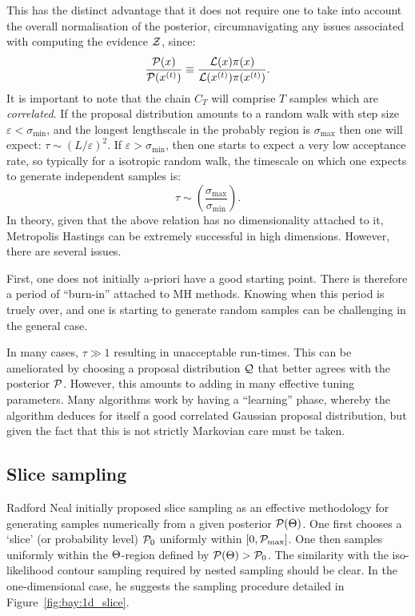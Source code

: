This has the distinct advantage that it does not require one to take into account the overall normalisation of the posterior, circumnavigating any issues associated with computing the evidence $\mathcal{Z}$, since:
\begin{equation}
  \frac{\mathcal{P}(x)}{\mathcal{P}(x^{(t)})} \equiv
  \frac{\mathcal{L}(x)\pi(x)}{\mathcal{L}(x^{(t)})\pi(x^{(t)})}.
\end{equation}
It is important to note that the chain $C_T$ will comprise $T$ samples which are {\em correlated}. If the proposal distribution amounts to a random walk with step size $\varepsilon<\sigma_{\min{}}$, and the longest lengthscale in the probably region is $\sigma_{\max{}}$  then one will expect: $\tau \sim {(L/\varepsilon)}^2$. If $\varepsilon>\sigma_{\min{}}$, then one starts to expect a very low acceptance rate, so typically for a isotropic random walk, the timescale on which one expects to generate independent samples is:
\begin{equation}
  \tau \sim \left( \frac{\sigma_{\max{}}}{\sigma_{\min{}}} \right).
\end{equation}
In theory, given that the above relation has no dimensionality attached to it, Metropolis Hastings can be extremely successful in high dimensions. However, there are several issues.

First, one does not initially a-priori have a good starting point. There is therefore a period of ``burn-in'' attached to MH methods. Knowing when this period is truely over, and one is starting to generate random samples can be challenging in the general case.

In many cases, $\tau\gg1$ resulting in unacceptable run-times. This can be ameliorated by choosing a proposal distribution $\mathcal{Q}$ that better agrees with the posterior $\mathcal{P}$. However, this amounts to adding in many effective tuning parameters. Many algorithms work by having a ``learning'' phase, whereby the algorithm deduces for itself a good correlated Gaussian proposal distribution, but given the fact that this is not strictly Markovian care must be taken.



\subsection{Slice sampling}
\label{sec:sm:slice}
Radford Neal initially proposed slice sampling as an effective methodology for generating samples numerically from a given posterior $\mathcal{P}(\Theta)$. One first chooses a `slice' (or probability level) $\mathcal{P}_0$ uniformly within $[0,\mathcal{P}_{\mathrm{max}}]$. One then samples uniformly within the $\Theta$-region defined by $\mathcal{P}(\Theta)>\mathcal{P}_0$. The similarity with the iso-likelihood contour sampling required by nested sampling should be clear. In the one-dimensional case, he suggests the sampling procedure detailed in Figure~\ref{fig:bay:1d_slice}.

